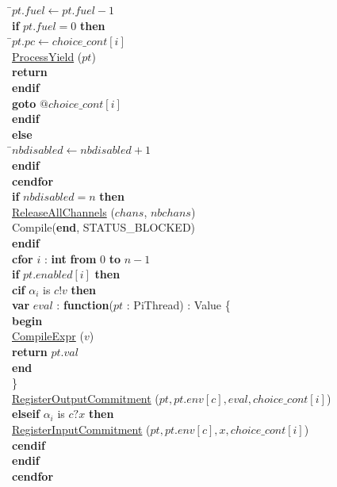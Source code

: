 \documentclass[a4paper,11pt]{article}
\newenvironment{program}{
  \begin{sffamily}
  \begin{scriptsize}
  \begin{tabbing}}
 {\end{tabbing}
  \end{scriptsize}
  \end{sffamily}}
\newcommand{\kw}[1]{\textsf{\textbf{#1}}}
\newcommand{\pindent}{\hspace{2em}\=}
\newcommand{\compiletime}[1]{\textcolor{compilecolor}{#1}}
\newcommand{\synchro}[1]{\textcolor{synchrocolor}{#1}}
\newcommand{\myref}[1]{
  \hyperref[#1]{#1}
}
\begin{document}
\begin{program}
  \>\>\>\pindent$pt.fuel \leftarrow pt.fuel - 1$ \\
  \>\>\>\>\kw{if} $pt.fuel = 0$ \kw{then} \\
  \>\>\>\>\pindent $pt.pc \leftarrow choice\_cont[i]$ \\
  \>\>\>\>\>\myref{ProcessYield}($pt$) \\
  \>\>\>\>\>\kw{return} \\
  \>\>\>\>\kw{endif} \\
  \>\>\>\>\kw{goto} $@choice\_cont[i]$ \\
  \>\>\>\kw{endif} \\
    \>\>\kw{else} \\
  \>\>\pindent$nbdisabled \leftarrow nbdisabled + 1$ \\
  \>\>\kw{endif} \\
  \>\compiletime{\kw{cendfor}} \\
  \>\kw{if} $nbdisabled = n$ \kw{then} \\
  \>\pindent\synchro{\myref{ReleaseAllChannels}($chans$, $nbchans$)} \\
  \>\>\compiletime{Compile(\kw{end}, STATUS\_BLOCKED)} \\
  \>\kw{endif} \\
  \>\compiletime{\kw{cfor} $i$ : \kw{int} \kw{from} $0$ \kw{to} $n-1$} \\
  \>\pindent\kw{if} $pt.enabled[i]$ \kw{then} \\
  \>\>\pindent\compiletime{\kw{cif} $\alpha_i$ is $c!v$ \kw{then}} \\
  \>\>\>\pindent\kw{var} $eval$ : \kw{function}($pt$ : PiThread) : Value \{ \\
  \>\>\>\>\pindent\kw{begin} \\
  \>\>\>\>\>\pindent\compiletime{\myref{CompileExpr}($v$)} \\
  \>\>\>\>\>\>\kw{return} $pt.val$ \\
  \>\>\>\>\>\kw{end} \\
  \>\>\>\>\} \\
  \>\>\>\>\myref{RegisterOutputCommitment}($pt, pt.env[c], eval, choice\_cont[i]$) \\
  \>\>\>\compiletime{\kw{elseif} $\alpha_i$ is $c?x$ \kw{then}} \\
  \>\>\>\pindent\myref{RegisterInputCommitment}($pt, pt.env[c], x, choice\_cont[i]$) \\
  \>\>\>\compiletime{\kw{cendif}} \\
  \>\>\kw{endif} \\
  \>\compiletime{\kw{cendfor}} \\

\end{program}
\end{document}

